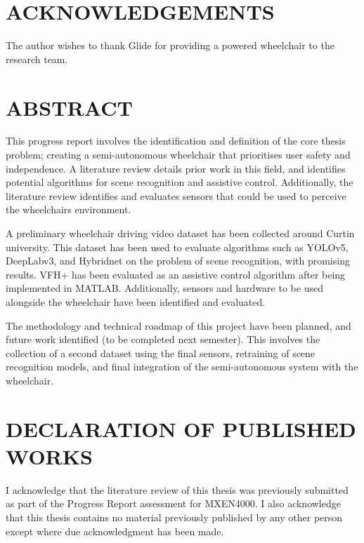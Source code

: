 \documentclass[12pt,twoside]{article}
\begin{document}

\thispagestyle{empty}\null\clearpage


\thispagestyle{empty}\null\clearpage

\section*{ACKNOWLEDGEMENTS}
The author wishes to thank Glide for providing a powered wheelchair to the research team.
\cleardoublepage

\section*{ABSTRACT}
This progress report involves the identification and definition of the core thesis problem;
creating a semi-autonomous wheelchair that prioritises user safety and independence.
A literature review details prior work in this field, and identifies potential algorithms
for scene recognition and assistive control. Additionally, the literature review identifies and evaluates
sensors that could be used to perceive the wheelchairs environment.

A preliminary wheelchair driving video dataset has been collected around Curtin university.
This dataset has been used to evaluate algorithms such as YOLOv5, DeepLabv3, and Hybridnet on
the problem of scene recognition, with promising results. VFH+ has been evaluated as an assistive
control algorithm after being implemented in MATLAB. Additionally, sensors and hardware to be used
alongside the wheelchair have been identified and evaluated.

The methodology and technical roadmap of this project have been planned, and future work identified (to be completed
next semester). This involves the collection of a second dataset using the final sensors, retraining of
scene recognition models, and final integration of the semi-autonomous system with the wheelchair.

\cleardoublepage

\section*{DECLARATION OF PUBLISHED WORKS}
I acknowledge that the literature review of this thesis was previously submitted as part of the Progress Report assessment for MXEN4000.
I also acknowledge that this thesis contains no material previously
published by any other person except where due acknowledgment has been made.
\end{document}
